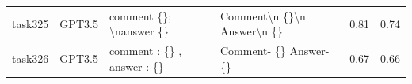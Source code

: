 \begin{longtable}{@{}p{0.8cm\tiny}p{1cm\tiny}p{4.1cm\ttfamily\tiny}p{4.1cm\ttfamily\tiny}p{0.8cm\tiny}p{0.8cm\tiny}@{}}
task325   & GPT3.5    & comment \{\}; \textbackslash{}nanswer \{\}                                                                                                                                                                                                                                                                                                                                                                                                                                                                              & Comment\textbackslash{}n \{\}\textbackslash{}n Answer\textbackslash{}n \{\}                                                                                                                                                                                                                                                                                                                                                                                                                                                                                                       & 0.81 & 0.74 \\
task326   & GPT3.5    & comment : \{\} , answer : \{\}                                                                                                                                                                                                                                                                                                                                                                                                                                                                                          & Comment- \{\}  Answer- \{\}                                                                                                                                                                                                                                                                                                                                                                                                                                                                                                                                                       & 0.67 & 0.66 \\

\end{longtable}
